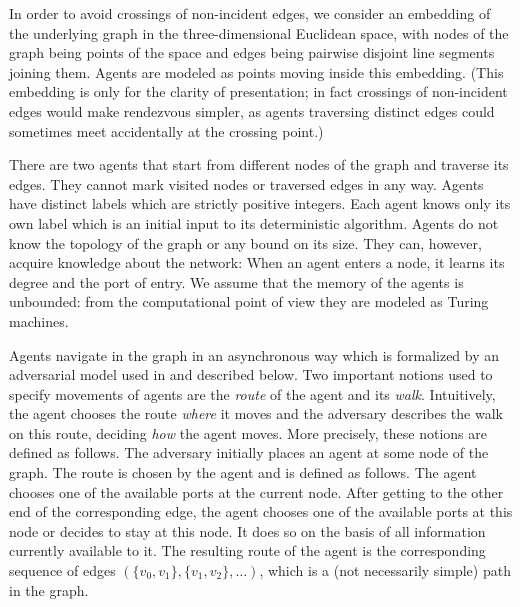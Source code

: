 \documentclass [11pt] {article}
\begin{document}
In order to avoid crossings of non-incident edges, we consider an embedding of the underlying graph in the
three-dimensional Euclidean space, with nodes of the graph being points of the
space and edges being
pairwise disjoint line segments joining them.
 Agents are modeled
as points moving inside this embedding. (This embedding is only for the clarity of presentation; in fact crossings of non-incident edges
would make rendezvous simpler, as agents traversing distinct edges could sometimes meet accidentally at the crossing point.)


There are two agents that start from different nodes of the graph  and  traverse its edges.
They cannot mark visited nodes or traversed edges in any way.
Agents have distinct labels which are strictly positive integers. Each agent knows only its own label which is an initial input
to its deterministic algorithm.
Agents do not  know the topology of the graph or any bound on its size. They can, however, acquire knowledge about the network:
When an agent enters a node, it learns its degree and the port of entry. We assume that the memory of the agents is unbounded: from the computational point of view they are modeled as 
Turing machines. 

Agents navigate in the graph in an asynchronous way which is formalized by an adversarial model used in 
\cite{BCGIL,CCGL,CLP,DGKKPV,GP} and described below.
Two important notions used to specify movements of agents are the {\em route} of the agent and its {\em walk}.
Intuitively, the agent chooses the route {\em where} it moves and the adversary describes the walk on this 
route, deciding {\em how} the agent  moves. More precisely,  these notions are defined as follows.
The adversary initially places an agent at some node of the graph.
The route is chosen by the agent and is defined as follows. 
The agent chooses one of the available ports at the current node. 
After getting to the other end of the corresponding edge, the agent chooses one of the available ports at this node
or decides to stay at this node. It does so on the basis of all information currently available to it.
The resulting route of the agent is the corresponding sequence of edges $(\{v_0,v_1\},\{v_1,v_2\},\dots)$,
which is a (not necessarily simple) path in the graph. 
\end{document}
